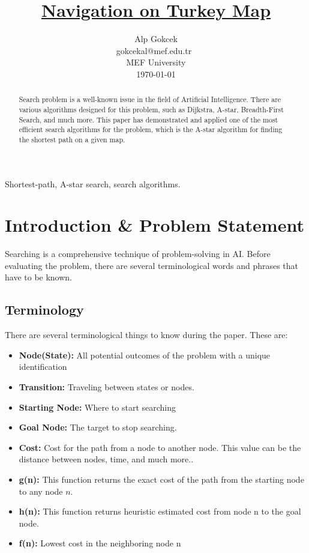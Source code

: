 \documentclass{IEEEtran}
\author{Alp Gokcek \\gokcekal@mef.edu.tr \\ MEF University \\ \today}
\title{\href{https://github.com/alpgokcek/turkey-navigation-ai}{Navigation on Turkey Map}}
\begin{document}
	\maketitle
	\begin{abstract}
		Search problem is a well-known issue in the field of Artificial Intelligence. There are various algorithms designed for this problem, such as Dijkstra, A-star, Breadth-First Search, and much more. This paper has demonstrated and applied one of the most efficient search algorithms for the problem, which is the A-star algorithm for finding the shortest path on a given map. 
	\end{abstract}
\begin{IEEEkeywords}
	Shortest-path, A-star search, search algorithms.
\end{IEEEkeywords}
\section{Introduction \& Problem Statement\label{introduction}}
Searching is a comprehensive technique of problem-solving in AI. Before evaluating the problem, there are several terminological words and phrases that have to be known. 
\subsection{Terminology}
There are several terminological things to know during the paper. These are:
\begin{itemize}
	\item \textbf{Node(State):} All potential outcomes of the problem with a unique identification
	\item \textbf{Transition:} Traveling between states or nodes.
	\item \textbf{Starting Node:}  Where to start searching
	\item \textbf{Goal Node:} The target to stop searching.
	\item \textbf{Cost:} Cost for the path from a node to another node. This value can be the distance between nodes, time, and much more..
	\item \textbf{g(n):} This function returns the exact cost of the path from the starting node to any node $n$.
	\item \textbf{h(n):} This function returns heuristic estimated cost from node n to the goal node.
	\item \textbf{f(n):} Lowest cost in the neighboring node n
\end{itemize} \cite{astar-tds}
\end{document}
